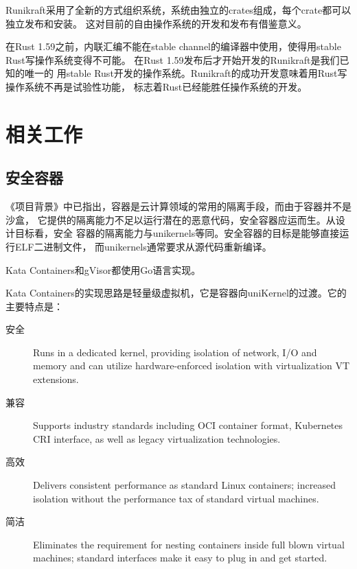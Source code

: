 \documentclass{../runikraft-report}
\begin{document}
Runikraft采用了全新的方式组织系统，系统由独立的crates组成，每个crate都可以独立发布和安装。
这对目前的自由操作系统的开发和发布有借鉴意义。

在Rust 1.59之前，内联汇编不能在stable channel的编译器中使用，使得用stable Rust写操作系统变得不可能。
在Rust 1.59发布后才开始开发的Runikraft是我们已知的唯一的
用stable Rust开发的操作系统。Runikraft的成功开发意味着用Rust写操作系统不再是试验性功能，
标志着Rust已经能胜任操作系统的开发。

\section{相关工作}

\subsection{安全容器}
《项目背景》中已指出，容器是云计算领域的常用的隔离手段，而由于容器并不是沙盒，
它提供的隔离能力不足以运行潜在的恶意代码，安全容器应运而生。从设计目标看，安全
容器的隔离能力与unikernels等同。安全容器的目标是能够直接运行ELF二进制文件，
而unikernels通常要求从源代码重新编译。

Kata Containers和gVisor都使用Go语言实现。

Kata Containers的实现思路是轻量级虚拟机，它是容器向uniKernel的过渡。它的主要特点是\cite{bib:kata}：
\begin{description}
\item[安全] Runs in a dedicated kernel, providing isolation of network,
I/O and memory and can utilize hardware-enforced isolation with virtualization VT extensions.
\item[兼容] Supports industry standards including OCI container format,
Kubernetes CRI interface, as well as legacy virtualization technologies.
\item[高效] Delivers consistent performance as standard Linux containers;
increased isolation without the performance tax of standard virtual machines.
\item[简洁] Eliminates the requirement for nesting containers inside full
blown virtual machines; standard interfaces make it easy to plug in and get started.
\end{description}
\end{document}
